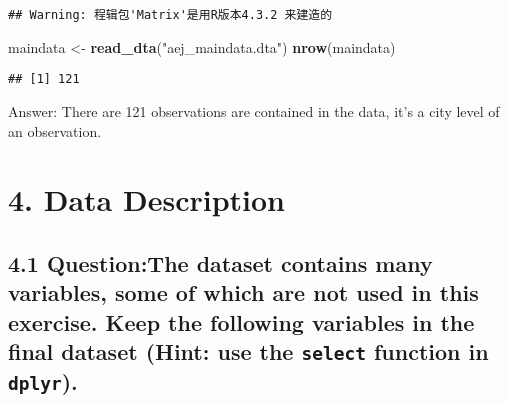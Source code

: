 \documentclass[
]{article}
\newenvironment{Shaded}{\begin{snugshade}}{\end{snugshade}}
\newcommand{\FunctionTok}[1]{\textcolor[rgb]{0.13,0.29,0.53}{\textbf{#1}}}
\newcommand{\NormalTok}[1]{#1}
\newcommand{\OtherTok}[1]{\textcolor[rgb]{0.56,0.35,0.01}{#1}}
\newcommand{\StringTok}[1]{\textcolor[rgb]{0.31,0.60,0.02}{#1}}
\begin{document}
\begin{verbatim}
## Warning: 程辑包'Matrix'是用R版本4.3.2 来建造的
\end{verbatim}

\begin{Shaded}
\begin{Highlighting}[]
\NormalTok{maindata }\OtherTok{\textless{}{-}} \FunctionTok{read\_dta}\NormalTok{(}\StringTok{"aej\_maindata.dta"}\NormalTok{)}
\FunctionTok{nrow}\NormalTok{(maindata)}
\end{Highlighting}
\end{Shaded}

\begin{verbatim}
## [1] 121
\end{verbatim}

Answer: There are 121 observations are contained in the data, it's a
city level of an observation.

\clearpage

\hypertarget{data-description}{%
\section{4. Data Description}\label{data-description}}

\hypertarget{questionthe-dataset-contains-many-variables-some-of-which-are-not-used-in-this-exercise.-keep-the-following-variables-in-the-final-dataset-hint-use-the-select-function-in-dplyr.}{%
\subsection{\texorpdfstring{4.1 Question:The dataset contains many
variables, some of which are not used in this exercise. Keep the
following variables in the final dataset (Hint: use the \texttt{select}
function in
\texttt{dplyr}).}{4.1 Question:The dataset contains many variables, some of which are not used in this exercise. Keep the following variables in the final dataset (Hint: use the select function in dplyr).}}\label{questionthe-dataset-contains-many-variables-some-of-which-are-not-used-in-this-exercise.-keep-the-following-variables-in-the-final-dataset-hint-use-the-select-function-in-dplyr.}}
\end{document}
